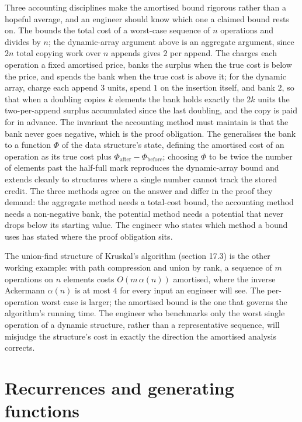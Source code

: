Three accounting disciplines make the amortised bound rigorous
rather than a hopeful average, and an engineer should know which one a
claimed bound rests on. The  bounds the
total cost of a worst-case sequence of $n$ operations and divides by
$n$; the dynamic-array argument above is an aggregate argument, since
$2n$ total copying work over $n$ appends gives $2$ per append. The
 charges each operation a fixed amortised
price, banks the surplus when the true cost is below the price, and
spends the bank when the true cost is above it; for the dynamic array,
charge each append $3$ units, spend $1$ on the insertion itself, and
bank $2$, so that when a doubling copies $k$ elements the bank holds
exactly the $2k$ units the two-per-append surplus accumulated since
the last doubling, and the copy is paid for in advance. The invariant
the accounting method must maintain is that the bank never goes
negative, which is the proof obligation. The  generalises the bank to a function $\Phi$ of the data
structure's state, defining the amortised cost of an operation as its
true cost plus $\Phi_{\text{after}} - \Phi_{\text{before}}$; choosing
$\Phi$ to be twice the number of elements past the half-full mark
reproduces the dynamic-array bound and extends cleanly to structures
where a single number cannot track the stored credit. The three
methods agree on the answer and differ in the proof they demand: the
aggregate method needs a total-cost bound, the accounting method needs
a non-negative bank, the potential method needs a potential that never
drops below its starting value. The engineer who states which method a
bound uses has stated where the proof obligation sits.

The union-find structure of Kruskal's algorithm (section 17.3) is
the other working example: with path compression and union by rank,
a sequence of $m$ operations on $n$ elements costs $O(m\, \alpha(n))$
amortised, where the inverse Ackermann $\alpha(n)$ is at most $4$
for every input an engineer will see. The per-operation worst case
is larger; the amortised bound is the one that governs the
algorithm's running time. The engineer who benchmarks only the worst
single operation of a dynamic structure, rather than a representative
sequence, will misjudge the structure's cost in exactly the
direction the amortised analysis corrects.

\section{Recurrences and generating functions}

